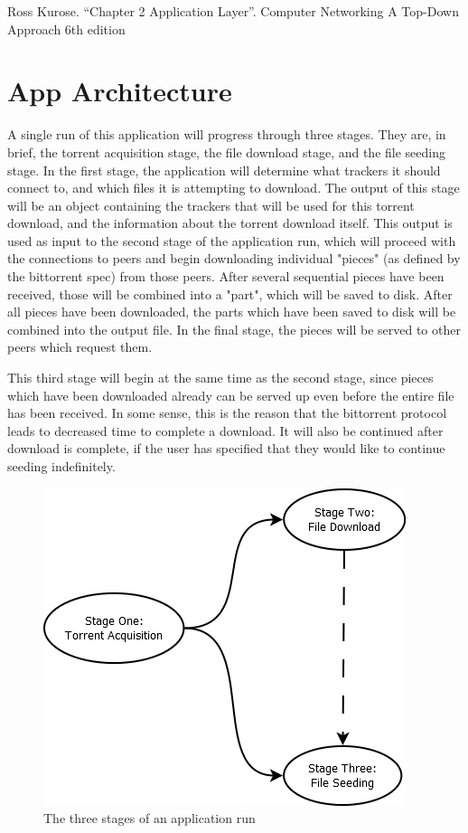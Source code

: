 \documentclass[letter]{scrartcl}
\begin{document}
Ross Kurose. “Chapter 2 Application Layer”. Computer Networking A Top-Down Approach 6th edition

\section{App Architecture}
A single run of this application will progress through three stages.  They are, in brief, the torrent acquisition stage, the file download stage, and the file seeding stage.  In the first stage, the application will determine what trackers it should connect to, and which files it is attempting to download.  The output of this stage will be an object containing the trackers that will be used for this torrent download, and the information about the torrent download itself.  This output is used as input to the second stage of the application run, which will proceed with the connections to peers and begin downloading individual "pieces" (as defined by the bittorrent spec) from those peers.  After several sequential pieces have been received, those will be combined into a "part", which will be saved to disk.  After all pieces have been downloaded, the parts which have been saved to disk will be combined into the output file.  In the final stage, the pieces will be served to other peers which request them.

This third stage will begin at the same time as the second stage, since pieces which have been downloaded already can be served up even before the entire file has been received.  In some sense, this is the reason that the bittorrent protocol leads to decreased time to complete a download.  It will also be continued after download is complete, if the user has specified that they would like to continue seeding indefinitely.

\begin{figure}[h]
\centering
\includegraphics[scale=.5]{stageDiagram.png}
\caption{The three stages of an application run}
\end{figure}
\end{document}
